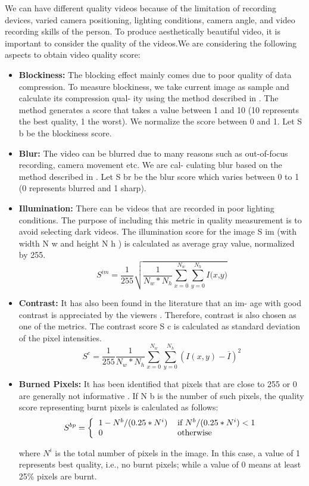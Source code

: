 \documentclass[conference]{IEEEtran}
\begin{document}
We can have different quality videos because of the limitation of
recording devices, varied camera positioning, lighting conditions,
camera angle, and video recording skills of the person. To produce
aesthetically beautiful video, it is important to consider the quality
of the videos.We are considering the following aspects to obtain
video quality score:

\begin{itemize}
    \item \textbf{Blockiness:} The blocking effect mainly comes due to poor
quality of data compression. To measure blockiness, we take
current image as sample and calculate its compression qual-
ity using the method described in \cite{18}. The method generates
a score that takes a value between 1 and 10 (10 represents the
best quality, 1 the worst). We normalize the score between 0
and 1. Let S b be the blockiness score.
    \item \textbf{Blur: }The video can be blurred due to many reasons such as
out-of-focus recording, camera movement etc. We are cal-
culating blur based on the method described in \cite{5}. Let S br
be the blur score which varies between 0 to 1 (0 represents
blurred and 1 sharp).
    \item \textbf{Illumination: }There can be videos that are recorded in poor
lighting conditions. The purpose of including this metric in
quality measurement is to avoid selecting dark videos. The
illumination score for the image S im (with width N w and
height N h ) is calculated as average gray value, normalized
by 255.
\begin{equation}
S^{im} = \frac{1}{255}\sqrt{\frac{1}{N_w*N_h}\sum_{x=0}^{N_w}\sum_{y=0}^{N_h}\textit{I(x,y)}}
\end{equation}
    \item \textbf{Contrast: }It has also been found in the literature that an im-
age with good contrast is appreciated by the viewers \cite{10}.
Therefore, contrast is also chosen as one of the metrics. The
contrast score S c is calculated as standard deviation of the
pixel intensities.
\begin{equation}
S^{c} = \frac{1}{255}\frac{1}{N_w*N_h}\sum_{x=0}^{N_w}\sum_{y=0}^{N_h} (I(x,y)-\overline{I})^{2}
\end{equation}

 \item \textbf{Burned Pixels: }It has been identified that pixels that are
close to 255 or 0 are generally not informative \cite{15}. If N b
is the number of such pixels, the quality score representing
burnt pixels is calculated as follows:
\begin{equation}
    S^{bp} = \bigg\{\begin{tabular}{ll}$1-N^b/(0.25*N^i)$ & if$\ N^b/(0.25*N^i)<1$\\0 & otherwise\end{tabular}
\end{equation}

where ${N^{i}}$ is the total number of pixels in the image. In this
case, a value of 1 represents best quality, i.e., no burnt pixels;
while a value of 0 means at least 25\% pixels are burnt.

\end{itemize}
\end{document}
